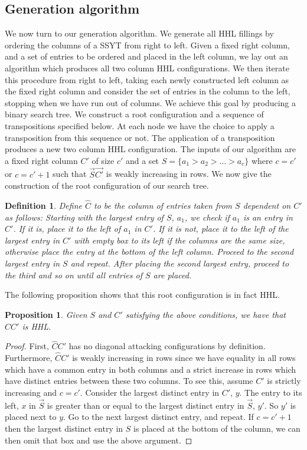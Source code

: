 \documentclass[11pt]{amsart}
\newtheorem{prop}{Proposition}[section]
\newtheorem{definition}{Definition}[section]
\begin{document}
{\subsection{Generation algorithm}
\indent We now turn to our generation algorithm. We generate all HHL fillings by ordering the columns of a SSYT from right to left. Given a fixed right column, and a set of entries to be ordered and placed in the left column, we lay out an algorithm which produces all two column HHL configurations. We then iterate this procedure from right to left, taking each newly constructed left column as the fixed right column and consider the set of entries in the column to the left, stopping when we have run out of columns. 
\newline\indent We achieve this goal by producing a binary search tree. We construct a root configuration and a sequence of transpositions specified below. At each node we have the choice to apply a transposition from this sequence or not. The application of a transposition produces a new two column HHL configuration. 
\newline\indent The inputs of our algorithm are a fixed right column $C'$ of size $c'$ and a set $S=\{a_{1}>a_{2}>\ldots>a_{c}\}$ where $c=c'$ or $c=c'+1$ such that $\overrightarrow{S}\overrightarrow{C'}$ is weakly increasing in rows. We now give the construction of the root configuration of our search tree. 
\begin{definition}
Define $\widehat{C}$ to be the column of entries taken from $S$ dependent on $C'$  as follows: Starting with the largest entry of $S$, $a_{1}$, we check if $a_{1}$ is an entry in $C'$. If it is, place it to the left of $a_{1}$ in $C'$. If it is not, place it to the left of the largest entry in $C'$ with empty box to its left if the columns are the same size, otherwise place the entry at the bottom of the left column. Proceed to the second largest entry in $S$ and repeat. After placing the second largest entry, proceed to the third and so on until all entries of $S$ are placed. 
\end{definition}
The following proposition shows that this root configuration is in fact HHL. 
\begin{prop}
Given $S$ and $C'$ satisfying the above conditions, we have that $\widehat{C}C'$ is HHL. 
\end{prop}
\begin{proof}
First, $\widehat{C}C'$ has no diagonal attacking configurations by definition. Furthermore, $\widehat{C}C'$ is weakly increasing in rows since we have equality in all rows which have a common entry in both columns and a strict increase in rows which have distinct entries between these two columns. To see this, assume $C'$ is strictly increasing and $c=c'$. Consider the largest distinct entry in $C'$, $y$. The entry to its left, $x$ in $\overrightarrow{S}$ is greater than or equal to the largest distinct entry in $\overrightarrow{S}$, $y'$. So $y'$ is placed next to $y$. Go to the next largest distinct entry, and repeat. If $c=c'+1$ then the largest distinct entry in $S$ is placed at the bottom of the column, we can then omit that box and use the above argument.

\end{proof}}
\end{document}
